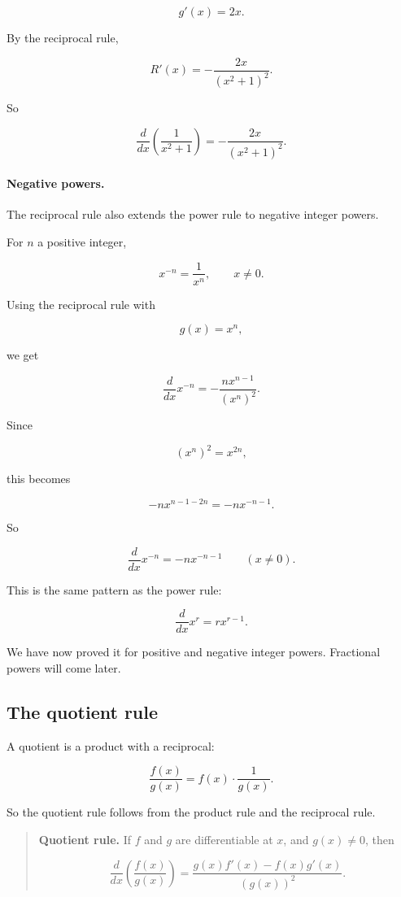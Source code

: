 \[
g'(x)=2x.
\]

By the reciprocal rule,

\[
R'(x)
=
-\frac{2x}{(x^2+1)^2}.
\]

So

\[
\boxed{
\frac{d}{dx}\left(\frac1{x^2+1}\right)
=
-\frac{2x}{(x^2+1)^2}.
}
\]

\paragraph{Negative powers.}
The reciprocal rule also extends the power rule to negative integer powers.

For \(n\) a positive integer,

\[
x^{-n}=\frac1{x^n},
\qquad x\neq0.
\]

Using the reciprocal rule with

\[
g(x)=x^n,
\]

we get

\[
\frac{d}{dx}x^{-n}
=
-\frac{nx^{n-1}}{(x^n)^2}.
\]

Since

\[
(x^n)^2=x^{2n},
\]

this becomes

\[
-nx^{n-1-2n}
=
-nx^{-n-1}.
\]

So

\[
\boxed{
\frac{d}{dx}x^{-n}=-n x^{-n-1}
\qquad (x\neq0).
}
\]

This is the same pattern as the power rule:

\[
\frac{d}{dx}x^r=rx^{r-1}.
\]

We have now proved it for positive and negative integer powers.  Fractional powers will come later.

\subsection{The quotient rule}
\label{subsec:quotient-rule}

A quotient is a product with a reciprocal:

\[
\frac{f(x)}{g(x)}
=
f(x)\cdot\frac1{g(x)}.
\]

So the quotient rule follows from the product rule and the reciprocal rule.

\begin{quote}
\textbf{Quotient rule.}
If \(f\) and \(g\) are differentiable at \(x\), and \(g(x)\neq0\), then

\[
\boxed{
\frac{d}{dx}\left(\frac{f(x)}{g(x)}\right)
=
\frac{g(x)f'(x)-f(x)g'(x)}{(g(x))^2}.
}
\]
\end{quote}

